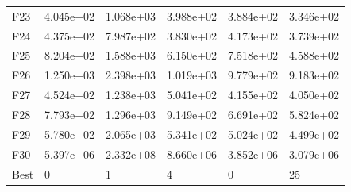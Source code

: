 \begin{tabular}{llllll}
F23  &  4.045e+02 &  1.068e+03 &  3.988e+02 &  3.884e+02 &  3.346e+02 \\
F24  &  4.375e+02 &  7.987e+02 &  3.830e+02 &  4.173e+02 &  3.739e+02 \\
F25  &  8.204e+02 &  1.588e+03 &  6.150e+02 &  7.518e+02 &  4.588e+02 \\
F26  &  1.250e+03 &  2.398e+03 &  1.019e+03 &  9.779e+02 &  9.183e+02 \\
F27  &  4.524e+02 &  1.238e+03 &  5.041e+02 &  4.155e+02 &  4.050e+02 \\
F28  &  7.793e+02 &  1.296e+03 &  9.149e+02 &  6.691e+02 &  5.824e+02 \\
F29  &  5.780e+02 &  2.065e+03 &  5.341e+02 &  5.024e+02 &  4.499e+02 \\
F30  &  5.397e+06 &  2.332e+08 &  8.660e+06 &  3.852e+06 &  3.079e+06 \\
Best &          0 &          1 &          4 &          0 &         25 \\
\bottomrule
\end{tabular}
